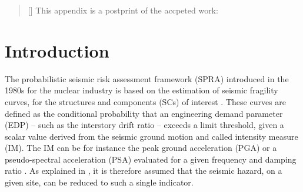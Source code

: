 

\begin{abstract}[\hspace*{-10pt}]
    This appendix is a postprint of the accpeted work:   %
\end{abstract}

\minitoc

\section{Introduction}




The probabilistic seismic risk assessment framework (SPRA) introduced in the 1980s for the nuclear industry is based on the estimation of seismic fragility curves, for the structures and components (SCs) of interest \citep{kennedy_probabilistic_1980,kennedy_seismic_1984,park_survey_1998,kennedy_risk_1999,cornell_hazard_2004}. These curves are defined as the conditional probability that an engineering demand parameter (EDP) -- such as the interstory drift ratio -- exceeds a limit threshold, given a scalar value derived from the seismic ground motion and called intensity measure (IM). The IM can be for instance the peak ground acceleration (PGA) or a pseudo-spectral acceleration (PSA) evaluated for a given frequency and damping ratio \citep{ciano_role_2020,sainct_efficient_2020,ciano_novel_2022}. As explained in \cite{cornell_hazard_2004}, it is therefore assumed that the seismic hazard, on a given site, can be reduced to such a single indicator.


